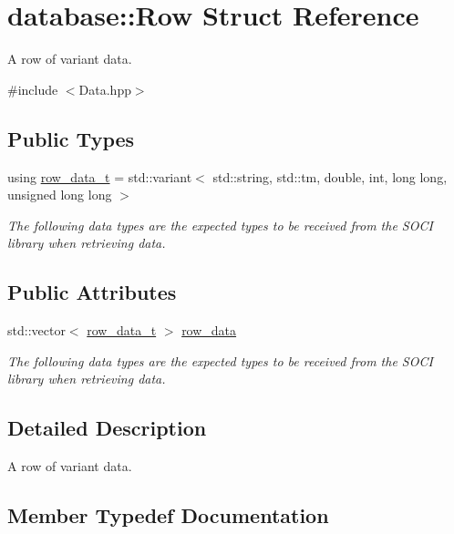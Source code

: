 \hypertarget{structdatabase_1_1_row}{}\section{database\+:\+:Row Struct Reference}
\label{structdatabase_1_1_row}


A row of variant data.  




{\ttfamily \#include $<$Data.\+hpp$>$}

\subsection*{Public Types}
\begin{DoxyCompactItemize}
\item 
using \hyperlink{structdatabase_1_1_row_a29c16186778c974af723db03751f3aa3}{row\+\_\+data\+\_\+t} = std\+::variant$<$ std\+::string, std\+::tm, double, int, long long, unsigned long long $>$
\begin{DoxyCompactList}\small\item\em The following data types are the expected types to be received from the S\+O\+CI library when retrieving data. \end{DoxyCompactList}\end{DoxyCompactItemize}
\subsection*{Public Attributes}
\begin{DoxyCompactItemize}
\item 
std\+::vector$<$ \hyperlink{structdatabase_1_1_row_a29c16186778c974af723db03751f3aa3}{row\+\_\+data\+\_\+t} $>$ \hyperlink{structdatabase_1_1_row_ae49f50c19ad3f4ec793c63b18623f1d7}{row\+\_\+data}
\begin{DoxyCompactList}\small\item\em The following data types are the expected types to be received from the S\+O\+CI library when retrieving data. \end{DoxyCompactList}\end{DoxyCompactItemize}


\subsection{Detailed Description}
A row of variant data. 

\subsection{Member Typedef Documentation}
